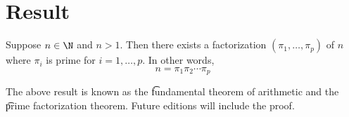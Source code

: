 
\section*{Result}

\begin{proposition}
Suppose $n \in \N  $ and $n > 1$.
Then there exists a factorization $(\pi _1, \dots , \pi _p)$ of $n$ where $\pi _i$ is prime for $i = 1, \dots , p$.
In other words,
\[
n = \pi _1\pi _2\cdots\pi _p
\]
\end{proposition}

The above result is known as the \t{fundamental theorem of arithmetic} and the \t{prime factorization theorem}.
Future editions will include the proof.

\blankpage